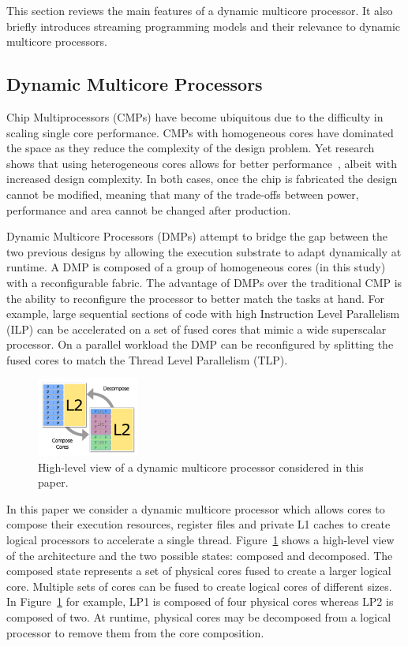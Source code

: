 This section reviews the main features of a dynamic multicore processor.
It also  briefly introduces streaming programming models and their relevance to dynamic multicore processors.

\subsection{Dynamic Multicore Processors}


Chip Multiprocessors (CMPs) have become ubiquitous due to the difficulty in scaling single core performance.
CMPs with homogeneous cores have dominated the space as they reduce the complexity of the design problem.
Yet research shows that using heterogeneous cores allows for better performance~\cite{suleman2009asymmetric}, albeit with increased design complexity. 
In both cases, once the chip is fabricated the design cannot be modified, meaning that many of the trade-offs between power, performance and area cannot be changed after production.

Dynamic Multicore Processors (DMPs) attempt to bridge the gap between the two previous designs by allowing the execution substrate to adapt dynamically at runtime.
A DMP is composed of a group of homogeneous cores (in this study) with a reconfigurable fabric.
The advantage of DMPs over the traditional CMP is the ability to reconfigure the processor to better match the tasks at hand.
For example, large sequential sections of code with high Instruction Level Parallelism (ILP) can be accelerated on a set of fused cores that mimic a wide superscalar processor.
On a parallel workload the DMP can be reconfigured by splitting the fused cores to match the Thread Level Parallelism (TLP).

\begin{figure}[h]
    \centering
    \includegraphics[width=0.3\textwidth]{streamit-paper/graphics/dmcgraph.pdf}
    \caption{High-level view of a dynamic multicore processor considered in this paper.}
    \label{fig:dynmulticore}
\end{figure}

In this paper we consider a dynamic multicore processor which allows cores to compose their execution resources, register files and private L1 caches to create logical processors to accelerate a single thread.
Figure~\ref{fig:dynmulticore} shows a high-level view of the architecture and the two possible states: composed and decomposed.
The composed state represents a set of physical cores fused to create a larger logical core.
Multiple sets of cores can be fused to create logical cores of different sizes.
In Figure~\ref{fig:dynmulticore} for example, LP1 is composed of four physical cores whereas LP2 is composed of two.
At runtime, physical cores may be decomposed from a logical processor to remove them from the core composition.

